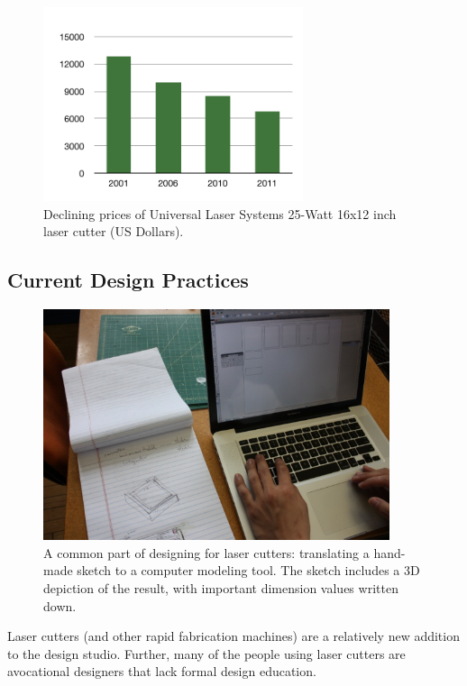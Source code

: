 \documentclass[11pt]{article}
\begin{document}
\begin{figure}[h] %
   \centering
   \includegraphics[width=3in]{img/prices.pdf} 
   \caption{Declining prices of Universal Laser Systems 25-Watt 16x12
     inch laser cutter (US Dollars).}
   \label{fig:prices}
\end{figure}

\subsection{Current Design Practices}

\begin{figure}[h] %
   \centering
   \includegraphics[width=4in]{img/translate-sketch-to-computer.jpg} 
   \caption{A common part of designing for laser cutters: translating
     a hand-made sketch to a computer modeling tool. The sketch
     includes a 3D depiction of the result, with important dimension
     values written down.}
   \label{fig:translating-to-computer}
\end{figure}

Laser cutters (and other rapid fabrication machines) are a relatively
new addition to the design studio. Further, many of the people using
laser cutters are avocational designers that lack formal design
education.
\end{document}
